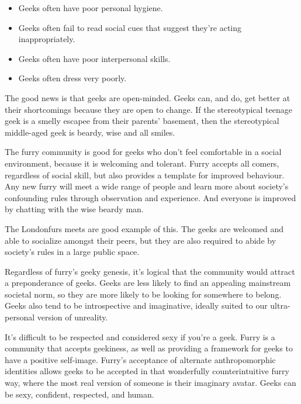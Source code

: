\begin{itemize}
  \item Geeks often have poor personal hygiene.
  \item Geeks often fail to read social cues that suggest they're acting inappropriately.
  \item Geeks often have poor interpersonal skills.
  \item Geeks often dress very poorly.
\end{itemize}

The good news is that geeks are open-minded. Geeks can, and do, get better at their shortcomings because they are open to change. If the stereotypical teenage geek is a smelly escapee from their parents' basement, then the stereotypical middle-aged geek is beardy, wise and all smiles.

The furry community is good for geeks who don't feel comfortable in a social environment, because it is welcoming and tolerant. Furry accepts all comers, regardless of social skill, but also provides a template for improved behaviour. Any new furry will meet a wide range of people and learn more about society's confounding rules through observation and experience. And everyone is improved by chatting with the wise beardy man.

The Londonfurs meets are good example of this. The geeks are welcomed and able to socialize amongst their peers, but they are also required to abide by society's rules in a large public space.

Regardless of furry's geeky genesis, it's logical that the community would attract a preponderance of geeks. Geeks are less likely to find an appealing mainstream societal norm, so they are more likely to be looking for somewhere to belong. Geeks also tend to be introspective and imaginative, ideally suited to our ultra-personal version of unreality.

It's difficult to be respected and considered sexy if you're a geek. Furry is a community that accepts geekiness, as well as providing a framework for geeks to have a positive self-image. Furry's acceptance of alternate anthropomorphic identities allows geeks to be accepted in that wonderfully counterintuitive furry way, where the most real version of someone is their imaginary avatar. Geeks can be sexy, confident, respected, and human.
